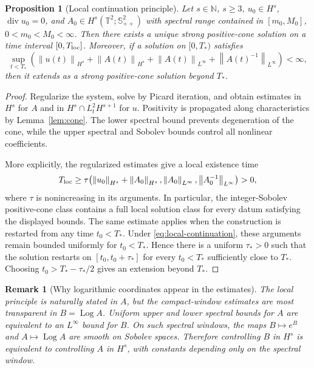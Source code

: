 \documentclass[11pt]{article}
\newtheorem{proposition}{Proposition}[section]
\newtheorem{remark}{Remark}[section]
\newcommand{\T}{\mathbb T}
\newcommand{\Spp}{\mathbb S_{++}}
\newcommand{\divv}{\operatorname{div}}
\newcommand{\Log}{\operatorname{Log}}
\newcommand{\norm}[1]{\left\lVert #1\right\rVert}
\begin{document}
\begin{proposition}[Local continuation principle]
\label{prop:local-continuation}
Let \(s\in\mathbb N\), \(s\ge3\), \(u_0\in H^s\), \(\divv u_0=0\), and
\(A_0\in H^s(\T^2;\Spp^2)\) with spectral range contained in
\([m_0,M_0]\), \(0<m_0<M_0<\infty\).  Then there exists a unique strong
positive-cone solution on a time interval \([0,T_{\rm loc}]\).  Moreover, if a
solution on \([0,T_*)\) satisfies
\[
  \sup_{t<T_*}\left(
  \norm{u(t)}_{H^s}+\norm{A(t)}_{H^s}
  +\norm{A(t)}_{L^\infty}
  +\norm{A(t)^{-1}}_{L^\infty}
  \right)<\infty,
  \label{eq:local-continuation}
\]
then it extends as a strong positive-cone solution beyond \(T_*\).
\end{proposition}

\begin{proof}
Regularize the system, solve by Picard iteration, and obtain estimates in
\(H^s\) for \(A\) and in \(H^s\cap L^2_tH^{s+1}\) for \(u\).  Positivity is
propagated along characteristics by Lemma~\ref{lem:cone}.  The lower spectral
bound prevents degeneration of the cone, while the upper spectral and Sobolev
bounds control all nonlinear coefficients.

More explicitly, the regularized estimates give a local existence time
\[
  T_{\rm loc}\ge
  \tau\!\left(
  \norm{u_0}_{H^s}+\norm{A_0}_{H^s},
  \norm{A_0}_{L^\infty},
  \norm{A_0^{-1}}_{L^\infty}
  \right)>0,
\]
where \(\tau\) is nonincreasing in its arguments.  In particular, the
integer-Sobolev positive-cone class contains a full local solution class for
every datum satisfying the displayed bounds.  The same estimate applies
when the construction is restarted from any time \(t_0<T_*\).  Under
\eqref{eq:local-continuation}, these arguments remain bounded uniformly for
\(t_0<T_*\).  Hence there is a uniform \(\tau_*>0\) such that the solution
restarts on \([t_0,t_0+\tau_*]\) for every \(t_0<T_*\) sufficiently close to
\(T_*\).  Choosing \(t_0>T_*-\tau_*/2\) gives an extension beyond \(T_*\).
\end{proof}

\begin{remark}[Why logarithmic coordinates appear in the estimates]
The local principle is naturally stated in \(A\), but the compact-window
estimates are most transparent in \(B=\Log A\).  Uniform upper and lower
spectral bounds for \(A\) are equivalent to an \(L^\infty\) bound for \(B\).
On such spectral windows, the maps \(B\mapsto e^B\) and \(A\mapsto\Log A\) are
smooth on Sobolev spaces.  Therefore controlling \(B\) in \(H^s\) is equivalent
to controlling \(A\) in \(H^s\), with constants depending only on the spectral
window.
\end{remark}
\end{document}
